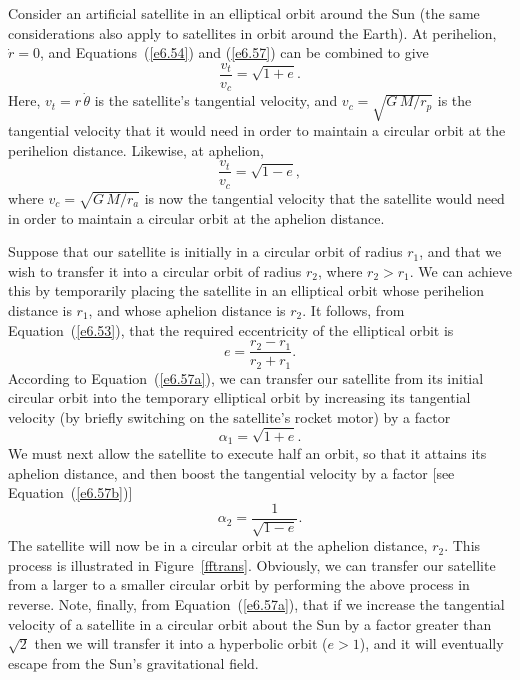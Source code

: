 Consider an artificial satellite in an elliptical orbit around the
Sun (the same considerations also apply to satellites in orbit around the Earth). At perihelion, $\dot{r}=0$, and Equations~(\ref{e6.54}) and (\ref{e6.57})
can be combined to give
\begin{equation}\label{e6.57a}
\frac{v_t}{v_c} = \sqrt{1+e}.
\end{equation}
Here, $v_t=r\,\dot{\theta}$ is the satellite's tangential velocity, and
$v_c=\sqrt{G\,M/r_p}$ is the tangential velocity that it would need in order to
maintain a circular orbit at the perihelion distance. 
Likewise, at aphelion,
\begin{equation}\label{e6.57b}
\frac{v_t}{v_c} = \sqrt{1-e},
\end{equation}
where $v_c=\sqrt{G\,M/r_a}$ is now the tangential velocity that the
satellite would need in order to maintain a circular orbit at the aphelion distance.

Suppose that our satellite is initially in a circular orbit of radius $r_1$, and that we wish
to transfer it into a circular orbit of radius $r_2$, where $r_2> r_1$. We can
achieve this by temporarily placing the satellite in an  elliptical orbit
whose perihelion distance is $r_1$, and whose aphelion distance is $r_2$. 
It follows, from Equation~(\ref{e6.53}), that the required eccentricity of the elliptical
orbit is
\begin{equation}
e = \frac{r_2-r_1}{r_2+r_1}.
\end{equation}
According to Equation~(\ref{e6.57a}), we can transfer our satellite from its
initial circular orbit into the
temporary elliptical orbit by increasing its tangential velocity (by briefly
switching on the satellite's rocket motor) by a factor
\begin{equation}
\alpha_1 = \sqrt{1+e}.
\end{equation}
We must next allow the satellite to execute half an orbit, so that it attains its aphelion
distance, and then boost the tangential velocity by a
factor [see Equation~(\ref{e6.57b})]
\begin{equation}
\alpha_2 = \frac{1}{\sqrt{1-e}}.
\end{equation}
The satellite will now be in a circular orbit at the aphelion distance, $r_2$.
This process is illustrated in Figure~\ref{fftrans}. Obviously, we can transfer
our satellite from a larger to a smaller circular orbit by performing
the above process in reverse. Note, finally, from Equation~(\ref{e6.57a}), that if we
increase the tangential velocity of a satellite in a circular orbit about the Sun by a
factor greater than $\sqrt{2}$ then we will transfer it into a
hyperbolic orbit ($e>1$), and it will eventually escape from the Sun's
gravitational field.

